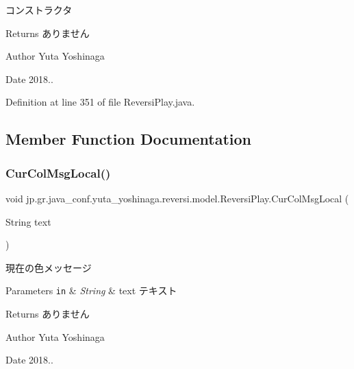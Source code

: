 コンストラクタ 

\begin{DoxyReturn}{Returns}
ありません 
\end{DoxyReturn}
\begin{DoxyAuthor}{Author}
Yuta Yoshinaga 
\end{DoxyAuthor}
\begin{DoxyDate}{Date}
2018.. 
\end{DoxyDate}


Definition at line 351 of file Reversi\+Play.\+java.



\subsection{Member Function Documentation}
\mbox{\label{classjp_1_1gr_1_1java__conf_1_1yuta__yoshinaga_1_1reversi_1_1model_1_1_reversi_play_a0dec187d4c4372a3470fac8e341ae9e8}} 
\subsubsection{\texorpdfstring{Cur\+Col\+Msg\+Local()}{CurColMsgLocal()}}
{\footnotesize\ttfamily void jp.\+gr.\+java\+\_\+conf.\+yuta\+\_\+yoshinaga.\+reversi.\+model.\+Reversi\+Play.\+Cur\+Col\+Msg\+Local (\begin{DoxyParamCaption}\item[{String}]{text }\end{DoxyParamCaption})\hspace{0.3cm}{\ttfamily [private]}}



現在の色メッセージ 


\begin{DoxyParams}[1]{Parameters}
\mbox{\tt in}  & {\em String} & text テキスト \\
\hline
\end{DoxyParams}
\begin{DoxyReturn}{Returns}
ありません 
\end{DoxyReturn}
\begin{DoxyAuthor}{Author}
Yuta Yoshinaga 
\end{DoxyAuthor}
\begin{DoxyDate}{Date}
2018.. 
\end{DoxyDate}


